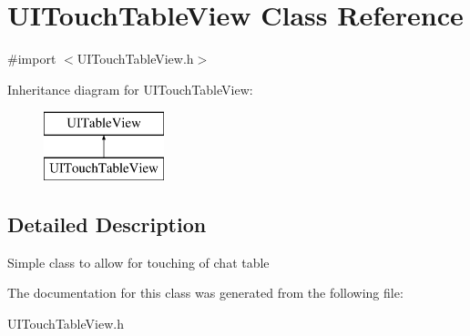 \hypertarget{interface_u_i_touch_table_view}{\section{U\+I\+Touch\+Table\+View Class Reference}
\label{interface_u_i_touch_table_view}
}


{\ttfamily \#import $<$U\+I\+Touch\+Table\+View.\+h$>$}

Inheritance diagram for U\+I\+Touch\+Table\+View\+:\begin{figure}[H]
\begin{center}
\leavevmode
\includegraphics[height=2.000000cm]{interface_u_i_touch_table_view}
\end{center}
\end{figure}


\subsection{Detailed Description}
Simple class to allow for touching of chat table 

The documentation for this class was generated from the following file\+:\begin{DoxyCompactItemize}
\item 
U\+I\+Touch\+Table\+View.\+h\end{DoxyCompactItemize}
